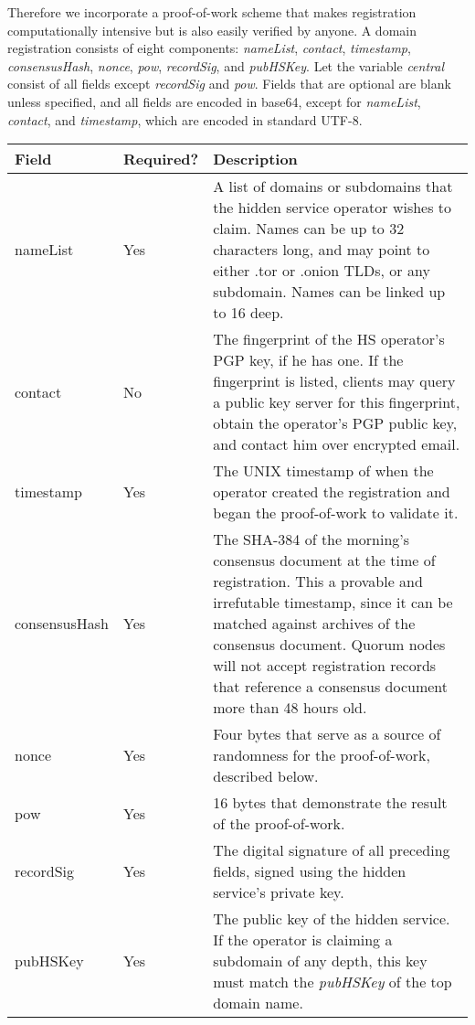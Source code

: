 Therefore we incorporate a proof-of-work scheme that makes registration computationally intensive but is also easily verified by anyone. A domain registration consists of eight components: \emph{nameList}, \emph{contact}, \emph{timestamp}, \emph{consensusHash}, \emph{nonce}, \emph{pow}, \emph{recordSig}, and \emph{pubHSKey}. Let the variable \emph{central} consist of all fields except \emph{recordSig} and \emph{pow}. Fields that are optional are blank unless specified, and all fields are encoded in base64, except for \emph{nameList}, \emph{contact}, and \emph{timestamp}, which are encoded in standard UTF-8.

\begin{center}
    \begin{tabular}{ | l | l | p{9cm} |}
    \hline
    \textbf{Field} & \textbf{Required?} & \textbf{Description} \\ \hline
    nameList & Yes & A list of domains or subdomains that the hidden service operator wishes to claim. Names can be up to 32 characters long, and may point to either .tor or .onion TLDs, or any subdomain. Names can be linked up to 16 deep. \\ \hline
    contact & No & The fingerprint of the HS operator's PGP key, if he has one. If the fingerprint is listed, clients may query a public key server for this fingerprint, obtain the operator's PGP public key, and contact him over encrypted email. \\ \hline
	timestamp & Yes & The UNIX timestamp of when the operator created the registration and began the proof-of-work to validate it. \\ \hline
	consensusHash & Yes & The SHA-384 of the morning's consensus document at the time of registration. This a provable and irrefutable timestamp, since it can be matched against archives of the consensus document. Quorum nodes will not accept registration records that reference a consensus document more than 48 hours old. \\ \hline
	nonce & Yes & Four bytes that serve as a source of randomness for the proof-of-work, described below. \\ \hline
    pow & Yes & 16 bytes that demonstrate the result of the proof-of-work. \\ \hline
    recordSig & Yes & The digital signature of all preceding fields, signed using the hidden service's private key. \\ \hline
    pubHSKey & Yes & The public key of the hidden service. If the operator is claiming a subdomain of any depth, this key must match the \emph{pubHSKey} of the top domain name.\\ \hline
    \end{tabular}
\end{center}

